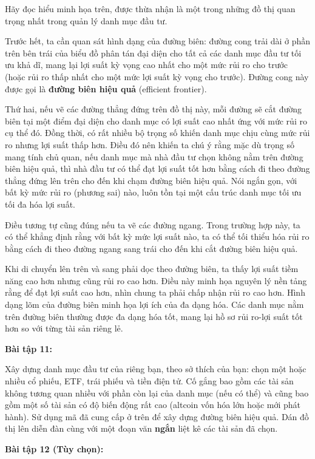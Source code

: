Hãy đọc hiểu minh họa trên, được thừa nhận là một trong những đồ thị quan trọng nhất trong quản lý danh mục đầu tư.

Trước hết, ta cần quan sát hình dạng của đường biên: đường cong trải dài ở phần trên bên trái của biểu đồ phân tán đại diện cho tất cả các danh mục đầu tư tối ưu khả dĩ, mang lại lợi suất kỳ vọng cao nhất cho một mức rủi ro cho trước (hoặc rủi ro thấp nhất cho một mức lợi suất kỳ vọng cho trước). Đường cong này được gọi là \textbf{đường biên hiệu quả} (efficient frontier).

Thứ hai, nếu vẽ các đường thẳng đứng trên đồ thị này, mỗi đường sẽ cắt đường biên tại một điểm đại diện cho danh mục có lợi suất cao nhất ứng với mức rủi ro cụ thể đó. Đồng thời, có rất nhiều bộ trọng số khiến danh mục chịu cùng mức rủi ro nhưng lợi suất thấp hơn. Điều đó nên khiến ta chú ý rằng mặc dù trọng số mang tính chủ quan, nếu danh mục mà nhà đầu tư chọn không nằm trên đường biên hiệu quả, thì nhà đầu tư có thể đạt lợi suất tốt hơn bằng cách đi theo đường thẳng đứng lên trên cho đến khi chạm đường biên hiệu quả. Nói ngắn gọn, với bất kỳ mức rủi ro (phương sai) nào, luôn tồn tại một cấu trúc danh mục tối ưu tối đa hóa lợi suất.

Điều tương tự cũng đúng nếu ta vẽ các đường ngang. Trong trường hợp này, ta có thể khẳng định rằng với bất kỳ mức lợi suất nào, ta có thể tối thiểu hóa rủi ro bằng cách đi theo đường ngang sang trái cho đến khi cắt đường biên hiệu quả.

Khi di chuyển lên trên và sang phải dọc theo đường biên, ta thấy lợi suất tiềm năng cao hơn nhưng cũng rủi ro cao hơn. Điều này minh họa nguyên lý nền tảng rằng để đạt lợi suất cao hơn, nhìn chung ta phải chấp nhận rủi ro cao hơn. Hình dạng lõm của đường biên minh họa lợi ích của đa dạng hóa. Các danh mục nằm trên đường biên thường được đa dạng hóa tốt, mang lại hồ sơ rủi ro-lợi suất tốt hơn so với từng tài sản riêng lẻ.

\textbf{Bài tập 11:}

Xây dựng danh mục đầu tư của riêng bạn, theo sở thích của bạn: chọn một hoặc nhiều cổ phiếu, ETF, trái phiếu và tiền điện tử. Cố gắng bao gồm các tài sản không tương quan nhiều với phần còn lại của danh mục (nếu có thể) và cũng bao gồm một số tài sản có độ biến động rất cao (altcoin vốn hóa lớn hoặc mới phát hành). Sử dụng mã đã cung cấp ở trên để xây dựng đường biên hiệu quả. Dán đồ thị lên diễn đàn cùng với một đoạn văn \textbf{ngắn} liệt kê các tài sản đã chọn.

\textbf{Bài tập 12 (Tùy chọn):}

